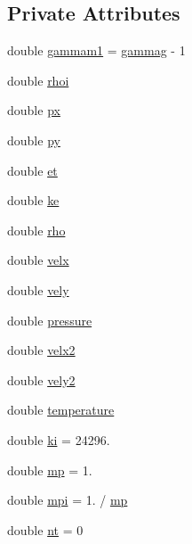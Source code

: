 \subsection*{Private Attributes}
\begin{DoxyCompactItemize}
\item 
double \hyperlink{classRadiativeCooling_afdedfb8ef0a890698e2523a9bdb02b09}{gammam1} = \hyperlink{global_8h_a637811bc2432fc76801f5ca1a91c712c}{gammag} -\/ 1
\item 
double \hyperlink{classRadiativeCooling_a25c90a272c6681f62227a6f72b30c56c}{rhoi}
\item 
double \hyperlink{classRadiativeCooling_a85ca1dbfd6e59c1e0cef1386ae8982b4}{px}
\item 
double \hyperlink{classRadiativeCooling_a77af20c4659490ae2f882b9ef677bf32}{py}
\item 
double \hyperlink{classRadiativeCooling_aaa8f4525410deec9da13727c6db5fc8d}{et}
\item 
double \hyperlink{classRadiativeCooling_aa5ba5ecd4e284ebfbdcbdc3eba3f5f37}{ke}
\item 
double \hyperlink{classRadiativeCooling_ade1992f469b421d9d10b7bd29d7317fd}{rho}
\item 
double \hyperlink{classRadiativeCooling_aeb1a93ea3d2b1729570945b7e1634cd4}{velx}
\item 
double \hyperlink{classRadiativeCooling_a2a0da94db29e146ed14e92a954cdeeff}{vely}
\item 
double \hyperlink{classRadiativeCooling_a0c52edb57f85fdc2567203a1ee74b924}{pressure}
\item 
double \hyperlink{classRadiativeCooling_a90dcec1dca847312cbad423517d3efd2}{velx2}
\item 
double \hyperlink{classRadiativeCooling_a75b752a6028b57c82d5c012603e6ef8a}{vely2}
\item 
double \hyperlink{classRadiativeCooling_ab2d5da72b2fa7ebf6f2dfbe3369bddc1}{temperature}
\item 
double \hyperlink{classRadiativeCooling_a8a1417b75577166c7730dfff9fd2390d}{ki} = 24296.
\item 
double \hyperlink{classRadiativeCooling_a73af212844c9db7d9ced561ce282c588}{mp} = 1.
\item 
double \hyperlink{classRadiativeCooling_afeca5976d368a3e1bb3bff20feca3bce}{mpi} = 1. / \hyperlink{classRadiativeCooling_a73af212844c9db7d9ced561ce282c588}{mp}
\item 
double \hyperlink{classRadiativeCooling_aee7cd4b1371aec353beaa582dd869888}{nt} = 0

\end{DoxyCompactItemize}
